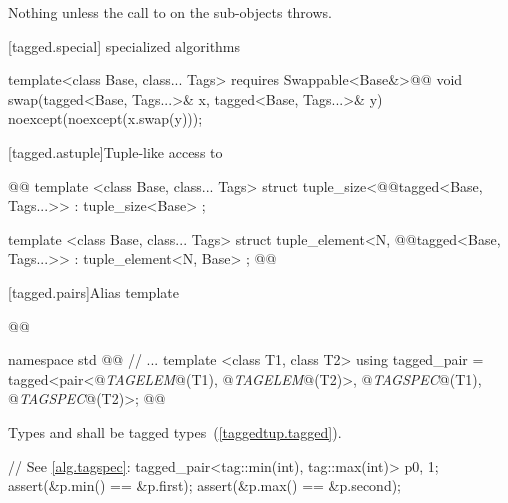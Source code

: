 {\begin{itemdescr}
\pnum
\throws Nothing unless the call to  on the  sub-objects throws.

\end{itemdescr}

[tagged.special]{ specialized algorithms}

%

\begin{itemdecl}
template<class Base, class... Tags>
  requires Swappable<Base&>@\newtxt{()}@
void swap(tagged<Base, Tags...>& x, tagged<Base, Tags...>& y)
  noexcept(noexcept(x.swap(y)));
\end{itemdecl}

\begin{itemdescr}
\pnum
\effects {}
\end{itemdescr}

[tagged.astuple]{Tuple-like access to }

%
%
\begin{itemdecl}
@@
  template <class Base, class... Tags>
  struct tuple_size<@@tagged<Base, Tags...>>
    : tuple_size<Base> { };

  template <class Base, class... Tags>
  struct tuple_element<N, @@tagged<Base, Tags...>>
    : tuple_element<N, Base> { };
@\newtxt{\}}@
\end{itemdecl}

[tagged.pairs]{Alias template }

\begin{codeblock}
@@

namespace std { @@
  // ...
  template <class T1, class T2>
  using tagged_pair = tagged<pair<@\textit{TAGELEM}@(T1), @\textit{TAGELEM}@(T2)>,
                             @\textit{TAGSPEC}@(T1), @\textit{TAGSPEC}@(T2)>;
}@\newtxt{\}\}}@
\end{codeblock}

\pnum Types   and  shall be tagged types~(\ref{taggedtup.tagged}).

\pnum \enterexample
\begin{codeblock}
// See \ref{alg.tagspec}:
tagged_pair<tag::min(int), tag::max(int)> p{0, 1};
assert(&p.min() == &p.first);
assert(&p.max() == &p.second);
\end{codeblock}
\exitexample

}
